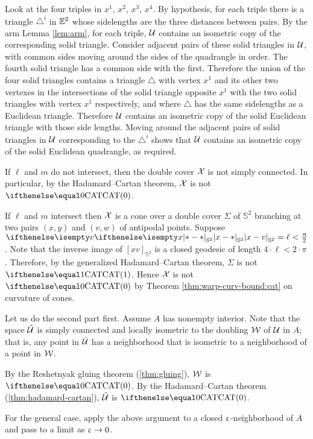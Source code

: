 Look at the four triples in $x^1$, $x^2$, $x^3$, $x^4$.
By  hypothesis, for each triple there is a triangle ${\triangle}^i$ in $\mathbb{E}^2$ whose  sidelengths are the three distances between pairs.
By the arm Lemma \eqref{lem:arm}, for each triple, $\mathcal{U}$ contains an isometric copy of the corresponding solid triangle.
Consider adjacent pairs of these solid triangles in $\mathcal{U}$, with common sides moving around the sides of the quadrangle in order.
The fourth solid triangle has a common side with the first.
Therefore the union of the four solid triangles contains a triangle $\triangle$ with vertex $x^1$ and its other two vertexes in the intersections of the solid  triangle opposite $x^1$ with the two solid triangles with vertex $x^1$ respectively, and where $\triangle$ has the same sidelengths as a Euclidean triangle.
Therefore $\mathcal{U}$ contains an isometric copy of the solid Euclidean triangle with those side lengths.
Moving around the adjacent pairs of solid triangles in $\mathcal{U}$ corresponding to the ${\triangle}^i$ shows that $\mathcal{U}$ contains an isometric copy of the solid Euclidean quadrangle, as required.

If $\ell$ and $m$ do not intersect, then the double cover $\mathcal{X}$ is not simply connected.
In particular, by the Hadamard--Cartan theorem, $\mathcal{X}$ is not $\CAT0$.

If $\ell$ and $m$ intersect then $\mathcal{X}$ is a cone over a double cover $\Sigma$ of $\mathbb{S}^2$ branching at two pairs $(x,y)$ and $(v,w)$ of antipodal points.
Suppose $\dist{x}{v}{\mathbb{S}^2}=\ell<\tfrac\pi2$.
Note that the inverse image of $[xv]_{\mathbb{S}^2}$ is a closed geodesic of length $4\cdot\ell<2\cdot\pi$.
Therefore, by the generalized Hadamard--Cartan theorem, $\Sigma$ is not $\CAT1$. Hence $\mathcal{X}$ is not $\CAT0$ by Theorem \ref{thm:warp-curv-bound:cat}  on curvature of cones.

Let us do the second part first.
Assume $A$ has nonempty interior. 
Note that the space $\tilde{\mathcal{U}}$ is simply connected and locally isometric to the doubling $\mathcal{W}$ of $\mathcal{U}$ in $A$;
that is, any point in $\tilde{\mathcal{U}}$ has a neighborhood 
that is isometric to a neighborhood of a point in $\mathcal{W}$.

By the Reshetnyak gluing theorem (\ref{thm:gluing}), $\mathcal{W}$ is $\CAT0$.
By the Hadamard--Cartan theorem (\ref{thm:hadamard-cartan}), $\tilde{\mathcal{U}}$ is $\CAT0$.

For the general case, apply the above argument to a closed $\upvarepsilon$-neighborhood of $A$
and pass to a limit as $\eps\to 0$.

